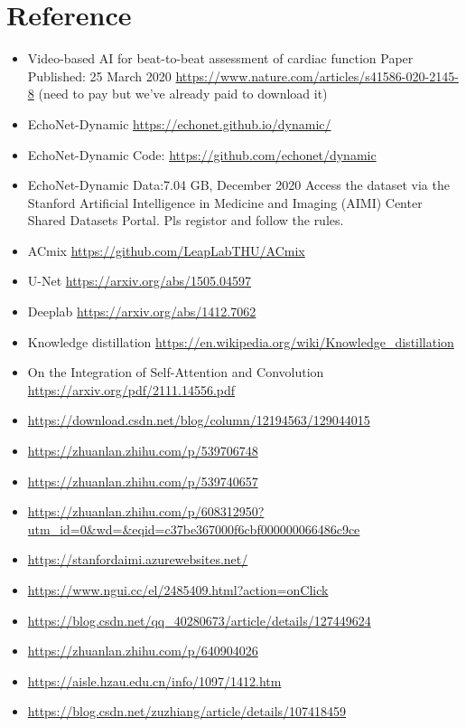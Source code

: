 
\section{Reference}

\begin{itemize}
  \item Video-based AI for beat-to-beat assessment of cardiac function 
Paper Published: 25 March 2020
\url{https://www.nature.com/articles/s41586-020-2145-8} (need to pay but we've already paid to download it)
  \item EchoNet-Dynamic \url{https://echonet.github.io/dynamic/}
  \item EchoNet-Dynamic Code: \url{https://github.com/echonet/dynamic}
  \item EchoNet-Dynamic	 Data:7.04 GB, December 2020
Access the dataset via the Stanford Artificial Intelligence in Medicine and Imaging (AIMI) Center Shared Datasets Portal. Pls registor and follow the rules.
  \item ACmix  \url{https://github.com/LeapLabTHU/ACmix}
  \item U-Net \url{https://arxiv.org/abs/1505.04597}
  \item Deeplab \url{https://arxiv.org/abs/1412.7062}
  \item Knowledge distillation \url{https://en.wikipedia.org/wiki/Knowledge_distillation}
  \item On the Integration of Self-Attention and Convolution  \url{https://arxiv.org/pdf/2111.14556.pdf}
  \item \url{https://download.csdn.net/blog/column/12194563/129044015}
  \item \url{https://zhuanlan.zhihu.com/p/539706748}
  \item \url{https://zhuanlan.zhihu.com/p/539740657}
  \item \url{https://zhuanlan.zhihu.com/p/608312950?utm_id=0&wd=&eqid=c37be367000f6cbf000000066486c9ce}
  \item \url{https://stanfordaimi.azurewebsites.net/}
  \item \url{https://www.ngui.cc/el/2485409.html?action=onClick}
  \item \url{https://blog.csdn.net/qq_40280673/article/details/127449624}
  \item \url{https://zhuanlan.zhihu.com/p/640904026}
  \item \url{https://aisle.hzau.edu.cn/info/1097/1412.htm}
  \item \url{https://blog.csdn.net/zuzhiang/article/details/107418459}
\end{itemize}
